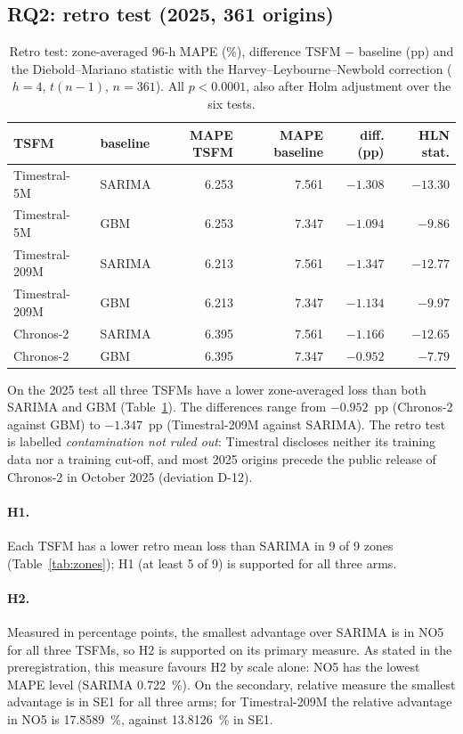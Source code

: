 \subsection{RQ2: retro test (2025, 361 origins)}
\begin{table}[t]
\centering
\caption{Retro test: zone-averaged 96-h MAPE (\%), difference TSFM $-$ baseline (pp) and the
Diebold--Mariano statistic with the Harvey--Leybourne--Newbold correction ($h=4$, $t(n-1)$, $n=361$).
All $p<0.0001$, also after Holm adjustment over the six tests.}
\label{tab:retro}
\begin{tabular}{llrrrr}
\toprule
TSFM & baseline & MAPE TSFM & MAPE baseline & diff. (pp) & HLN stat. \\
\midrule
Timestral-5M & SARIMA & 6.253 & 7.561 & $-1.308$ & $-13.30$ \\
Timestral-5M & GBM & 6.253 & 7.347 & $-1.094$ & $-9.86$ \\
Timestral-209M & SARIMA & 6.213 & 7.561 & $-1.347$ & $-12.77$ \\
Timestral-209M & GBM & 6.213 & 7.347 & $-1.134$ & $-9.97$ \\
Chronos-2 & SARIMA & 6.395 & 7.561 & $-1.166$ & $-12.65$ \\
Chronos-2 & GBM & 6.395 & 7.347 & $-0.952$ & $-7.79$ \\
\bottomrule
\end{tabular}
\end{table}

On the 2025 test all three TSFMs have a lower zone-averaged loss than both SARIMA and GBM
(Table~\ref{tab:retro}). The differences range from $-0.952$~pp (Chronos-2 against GBM) to
$-1.347$~pp (Timestral-209M against SARIMA). The retro test is labelled
\emph{contamination not ruled out}: Timestral discloses neither its training data nor a training
cut-off, and most 2025 origins precede the public release of Chronos-2 in October 2025 (deviation
D-12).

\paragraph{H1.} Each TSFM has a lower retro mean loss than SARIMA in 9 of 9 zones
(Table~\ref{tab:zones}); H1 (at least 5 of 9) is supported for all three arms.

\paragraph{H2.} Measured in percentage points, the smallest advantage over SARIMA is in NO5 for
all three TSFMs, so H2 is supported on its primary measure. As stated in the preregistration,
this measure favours H2 by scale alone: NO5 has the lowest MAPE level (SARIMA 0.722~\%). On the
secondary, relative measure the smallest advantage is in SE1 for all three arms; for
Timestral-209M the relative advantage in NO5 is 17.8589~\%, against 13.8126~\% in SE1.

